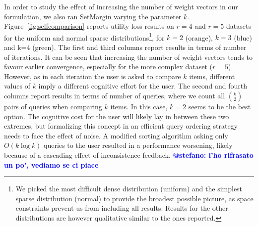 \documentclass{article}
\renewcommand\[{\begin{equation}}
\renewcommand\]{\end{equation}}
\newcommand{\vecvar}[1]{\ensuremath{\boldsymbol{#1}}}
\newcommand{\vx}{\vecvar{x}}
\newcommand{\andrea}[1]{{\bf \textcolor{blue}{{\fbox{Andrea:} #1}}}}
\newcommand{\stefano}[1]{{\bf \textcolor{green}{{\fbox{Stefano:} #1}}}}
\begin{document}
In order to study the effect of increasing the number of weight
vectors in our formulation, we also ran {\sc SetMargin} varying the
parameter $k$. Figure~\ref{fig:selfcomparison} reports utility loss
results on $r=4$ and $r=5$ datasets for the uniform and normal sparse
distributions\footnote{We picked the most difficult dense distribution
  (uniform) and the simplest sparse distribution (normal) to provide
  the broadest possible picture, as space constraints prevent us from
  including all results. Results for the other distributions are
  however qualitative similar to the ones reported.}, for $k=2$
(orange), $k=3$ (blue) and k=4 (green). The first and third columns
report results in terms of number of iterations. It can be seen that
increasing the number of weight vectors tends to favour earlier
convergence, especially for the more complex dataset ($r=5$). However,
as in each iteration the user is asked to compare $k$ items, different
values of $k$ imply a different cognitive effort for the user. The
second and fourth columns report results in terms of number of
queries, where we count all $k \choose 2$ pairs of queries when
comparing $k$ items. In this case, $k=2$ seems to be the best
option. The cognitive cost for the user will likely lay in between
these two extremes, but formalizing this concept in an efficient query
ordering strategy needs to face the effect of noise.  A modified
sorting algorithm asking only $O(k\log k)$ queries to the user
resulted in a performance worsening, likely because of a cascading
effect of inconsistence feedback. \andrea{@stefano: l'ho rifrasato un
  po', vediamo se ci piace}


\end{document}
